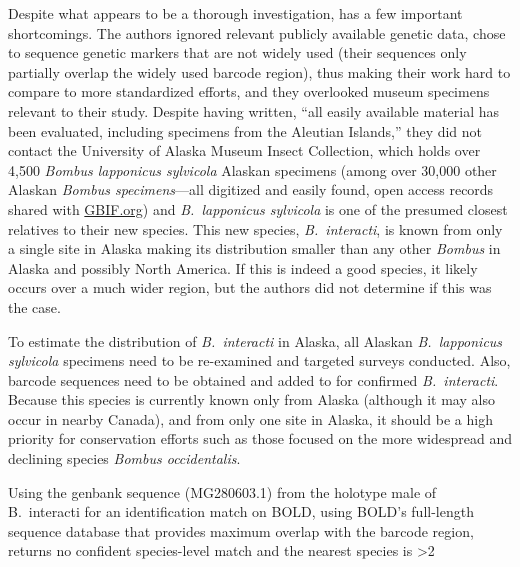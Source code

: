 \begin{multicols}{2}
Despite what appears to be a thorough investigation, \citet{Martinetetal2019} has a few important shortcomings. The authors ignored relevant publicly available genetic data, chose to sequence genetic markers that are not widely used (their  sequences only partially overlap the widely used  barcode region), thus making their work hard to compare to more standardized efforts, and they overlooked museum specimens relevant to their study. Despite having written, “all easily available material has been evaluated, including specimens from the Aleutian Islands,” \citep{Martinetetal2019} they did not contact the University of Alaska Museum Insect Collection, which holds over 4,500 \textit{Bombus lapponicus sylvicola} Alaskan specimens (among over 30,000 other Alaskan \textit{Bombus specimens}---all digitized and easily found, open access records shared with \href{https://www.gbif.org/}{GBIF.org}) and \textit{B.\ lapponicus sylvicola} is one of the presumed closest relatives to their new species. This new species, \textit{B.\ interacti}, is known from only a single site in Alaska making its distribution smaller than any other \textit{Bombus} in Alaska and possibly North America. If this is indeed a good species, it likely occurs over a much wider region, but the authors did not determine if this was the case. 

To estimate the distribution of \textit{B.\ interacti} in Alaska, all Alaskan \textit{B.\ lapponicus sylvicola} specimens need to be re-examined and targeted surveys conducted. Also,  barcode sequences need to be obtained and added to  for confirmed \textit{B.\ interacti}. Because this species is currently known only from Alaska (although it may also occur in nearby Canada), and from only one site in Alaska, it should be a high priority for conservation efforts such as those focused on the more widespread and declining species \textit{Bombus occidentalis}. 

Using the genbank  sequence (MG280603.1) from the holotype male of B.\ interacti for an identification match on BOLD, using BOLD’s full-length sequence database that provides maximum overlap with the  barcode region, returns no confident species-level match and the nearest species is >2%


\end{multicols}
